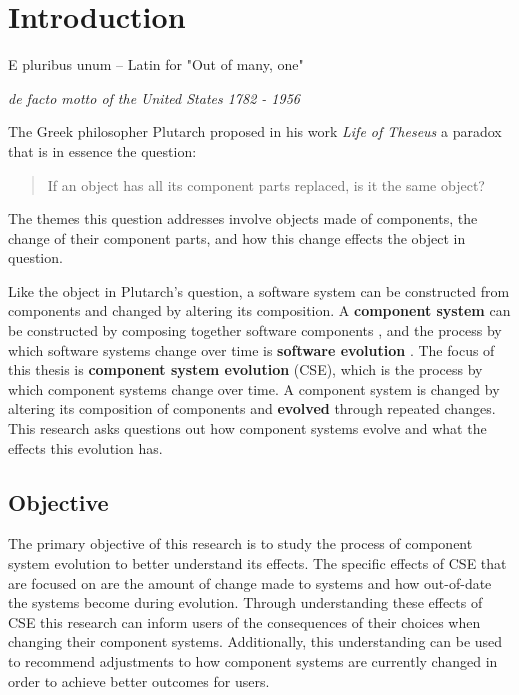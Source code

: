 \chapter{Introduction}
\label{introduction}
\epigraph{E pluribus unum -- Latin for "Out of many, one"}
{\textit{de facto motto of the United States 1782 - 1956}}
The Greek philosopher Plutarch proposed in his work \textit{Life of Theseus} a paradox that is in essence the question:
\begin{quote}
If an object has all its component parts replaced, is it the same object?
\end{quote}
The themes this question addresses involve objects made of components, the change of their component parts,
and how this change effects the object in question.

Like the object in Plutarch's question, a software system can be constructed from components and changed by altering its composition.
A \textbf{component system} can be constructed by composing together software components \citep{Szyperski2002},
and the process by which software systems change over time is \textbf{software evolution} \citep{lehman1980}.
The focus of this thesis is \textbf{component system evolution} (CSE), which is the process by which component systems change over time.
A component system is changed by altering its composition of components and \textbf{evolved} through repeated changes.
This research asks questions out how component systems evolve and what the effects this evolution has.

\section{Objective}
The primary objective of this research is to study the process of component system evolution to better understand its effects.
The specific effects of CSE that are focused on are the amount of change made to systems and how out-of-date the systems become during evolution.
Through understanding these effects of CSE this research can inform users of the consequences of their choices when changing their component systems.
Additionally, this understanding can be used to recommend adjustments to how component systems are currently changed in order to achieve better outcomes for users. 

